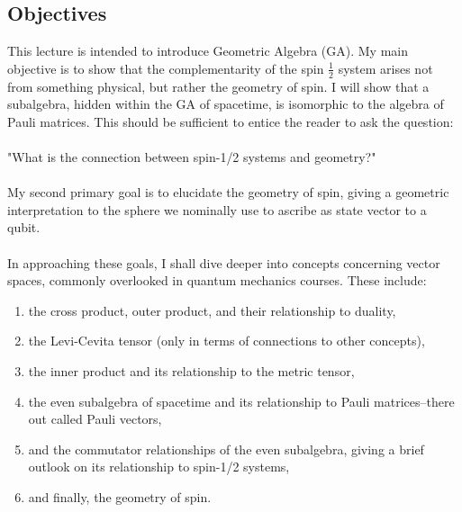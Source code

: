 \subsection{Objectives}
This lecture is intended to introduce Geometric Algebra (GA). My main objective is to show that the complementarity of the spin $\frac{1}{2}$ system arises not from something physical, but rather the geometry of spin. I will show that a subalgebra, hidden within the GA of spacetime, is isomorphic to the algebra of Pauli matrices.
This should be sufficient to entice the reader to ask the question: 
\\ \\
"What is the connection between spin-1/2 systems and geometry?"
\\ \\
My second primary goal is to elucidate the geometry of spin, giving a geometric interpretation to the sphere we nominally use to ascribe as state vector to a qubit. 
\\ \\
In approaching these goals, I shall dive deeper into concepts concerning vector spaces, commonly overlooked in quantum mechanics courses. These include:
\begin{enumerate}
    \item the cross product, outer product, and their relationship to duality,
    \item the Levi-Cevita tensor (only in terms of connections to other concepts),
    \item the inner product and its relationship to the metric tensor,
    \item the even subalgebra of spacetime and its relationship to Pauli matrices--there out called Pauli vectors,
    \item and the commutator relationships of the even subalgebra, giving a brief outlook on its relationship to spin-1/2 systems,
    \item and finally, the geometry of spin.
\end{enumerate}

